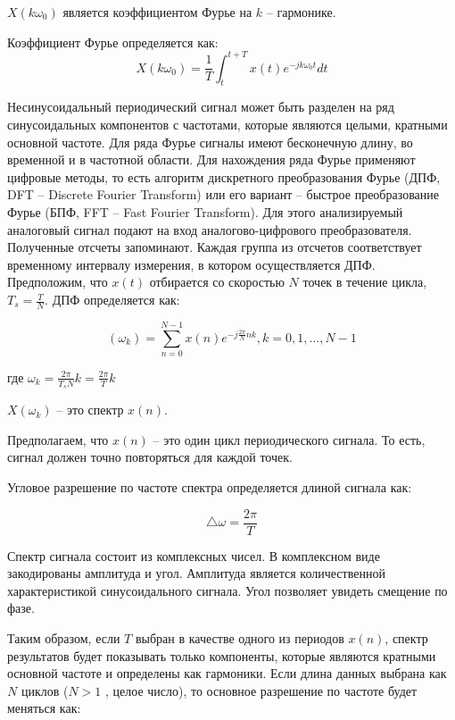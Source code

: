 $X(k \omega_{0})$ является коэффициентом Фурье на $k$ – гармонике.  

Коэффициент Фурье определяется как:
\begin{equation}
\label{eq:equation1}
X(k \omega_{0}) =  \frac{1}{T} \int_t^{t+T} x(t) e^{-jk \omega_{0} t} {d}t
\end{equation}

Несинусоидальный периодический сигнал может быть разделен на ряд синусоидальных компонентов с частотами, которые являются целыми, кратными основной частоте. Для ряда Фурье сигналы имеют бесконечную длину, во временной и в частотной области.
Для нахождения ряда Фурье применяют цифровые методы, то есть алгоритм дискретного преобразования Фурье (ДПФ, DFT – Discrete Fourier Transform) или его вариант – быстрое преобразование Фурье (БПФ, FFT – Fast Fourier Transform). Для этого анализируемый аналоговый сигнал подают на вход аналогово-цифрового преобразователя. Полученные отсчеты запоминают. Каждая группа из  отсчетов соответствует временному интервалу измерения, в котором осуществляется ДПФ.
Предположим, что $x(t)$ отбирается со скоростью $N$  точек в течение цикла, $T_s =\frac{T}{N}$. ДПФ определяется как:

\begin{equation}
	\label{eq:equation1}
(\omega_{k}) =  \displaystyle\sum_{n=0}^{N-1} x(n) e^{-j \frac{2 \pi}{N}nk}, k = 0,1, ..., N-1
\end{equation}

где $\omega_{k} = \frac{2 \pi}{T_s N} k = \frac{2 \pi}{T} k$

$X (\omega_{k})$ -- это спектр $x(n)$.
 
Предполагаем, что $x(n)$  – это один цикл периодического сигнала. То есть, сигнал должен точно повторяться для каждой   точек.

Угловое разрешение по частоте спектра определяется длиной сигнала как:

\begin{equation}
	\label{eq:equation1}
\bigtriangleup \omega = \frac{2 \pi}{T}
\end{equation}

Спектр сигнала состоит из комплексных чисел. В комплексном виде закодированы амплитуда и угол. Амплитуда является количественной характеристикой синусоидального сигнала. Угол позволяет увидеть смещение по фазе.

Таким образом, если $T$ выбран в качестве одного из периодов $x(n)$, спектр результатов будет показывать только компоненты, которые являются кратными основной частоте и определены как гармоники. Если длина данных выбрана как  $N$ циклов ($N>1$ , целое число), то основное разрешение по частоте будет меняться как:

